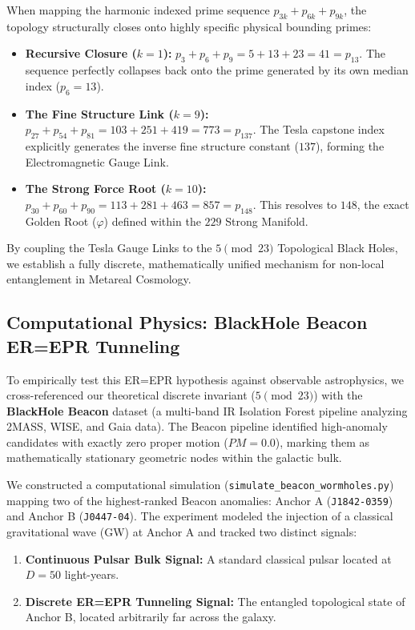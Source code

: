 When mapping the harmonic indexed prime sequence $p_{3k} + p_{6k} + p_{9k}$, the topology structurally closes onto highly specific physical bounding primes:
\begin{itemize}
    \item \textbf{Recursive Closure ($k=1$):} $p_3 + p_6 + p_9 = 5 + 13 + 23 = 41 = p_{13}$. The sequence perfectly collapses back onto the prime generated by its own median index ($p_6 = 13$).
    \item \textbf{The Fine Structure Link ($k=9$):} $p_{27} + p_{54} + p_{81} = 103 + 251 + 419 = 773 = p_{137}$. The Tesla capstone index explicitly generates the inverse fine structure constant ($137$), forming the Electromagnetic Gauge Link.
    \item \textbf{The Strong Force Root ($k=10$):} $p_{30} + p_{60} + p_{90} = 113 + 281 + 463 = 857 = p_{148}$. This resolves to $148$, the exact Golden Root ($\varphi$) defined within the $229$ Strong Manifold.
\end{itemize}

By coupling the Tesla Gauge Links to the $5 \pmod{23}$ Topological Black Holes, we establish a fully discrete, mathematically unified mechanism for non-local entanglement in Metareal Cosmology.

\subsection{Computational Physics: BlackHole Beacon ER=EPR Tunneling}

To empirically test this ER=EPR hypothesis against observable astrophysics, we cross-referenced our theoretical discrete invariant ($5 \pmod{23}$) with the \textbf{BlackHole Beacon} dataset (a multi-band IR Isolation Forest pipeline analyzing 2MASS, WISE, and Gaia data). The Beacon pipeline identified high-anomaly candidates with exactly zero proper motion ($PM=0.0$), marking them as mathematically stationary geometric nodes within the galactic bulk.

We constructed a computational simulation (\texttt{simulate\_beacon\_wormholes.py}) mapping two of the highest-ranked Beacon anomalies: Anchor A (\texttt{J1842-0359}) and Anchor B (\texttt{J0447-04}). The experiment modeled the injection of a classical gravitational wave (GW) at Anchor A and tracked two distinct signals:
\begin{enumerate}
    \item \textbf{Continuous Pulsar Bulk Signal:} A standard classical pulsar located at $D=50$ light-years.
    \item \textbf{Discrete ER=EPR Tunneling Signal:} The entangled topological state of Anchor B, located arbitrarily far across the galaxy.
\end{enumerate}

